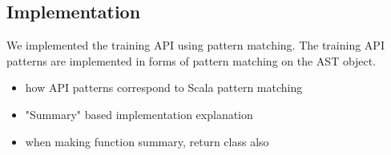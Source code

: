 \subsection{Implementation}

We implemented the training API using pattern matching.
The training API patterns are implemented in forms of pattern matching
on the AST object. 


\begin{itemize}
  \item how API patterns correspond to Scala pattern matching
  \item "Summary" based implementation explanation 
  \item when making function summary, return class also
\end{itemize}
